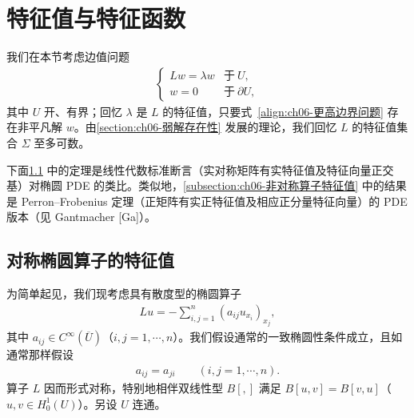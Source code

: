 \documentclass[../../main.tex]{subfiles}
\begin{document}
\section{特征值与特征函数}\label{section:ch03-特征线}

我们在本节考虑边值问题
\begin{align}
\begin{cases}
Lw=\lambda w & \text{于}\ U,\\
w=0 & \text{于}\ \partial U,
\end{cases}
\end{align}
其中 $U$ 开、有界；回忆 $\lambda$ 是 $L$ 的特征值，只要式~\eqref{align:ch06-更高边界问题} 存在非平凡解 $w$。由\cref{section:ch06-弱解存在性} 发展的理论，我们回忆 $L$ 的特征值集合 $\Sigma$ 至多可数。

下面\cref{subsection:ch06-对称算子特征值} 中的定理是线性代数标准断言（实对称矩阵有实特征值及特征向量正交基）对椭圆 PDE 的类比。类似地，\cref{subsection:ch06-非对称算子特征值} 中的结果是 Perron--Frobenius 定理（正矩阵有实正特征值及相应正分量特征向量）的 PDE 版本（见 Gantmacher [Ga]）。

\subsection{对称椭圆算子的特征值}\label{subsection:ch06-对称算子特征值}

为简单起见，我们现考虑具有散度型的椭圆算子
\begin{align}
Lu=-\sum_{i,j=1}^{n}(a_{ij}u_{x_{i}})_{x_{j}},
\end{align}
其中 $a_{ij}\in C^{\infty}(\overline{U})$（$i,j=1,\cdots,n$）。我们假设通常的一致椭圆性条件成立，且如通常那样假设
\begin{align}
a_{ij}=a_{ji}\qquad (i,j=1,\cdots,n).
\end{align}
算子 $L$ 因而形式对称，特别地相伴双线性型 $B[,]$ 满足 $B[u,v]=B[v,u]$（$u,v\in H^{1}_{0}(U)$）。另设 $U$ 连通。
\end{document}
